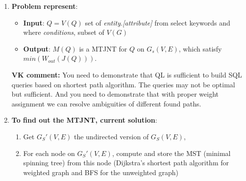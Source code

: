 \begin{enumerate}
\begin{itemize}
{\bf VK comment:} seems like no one use it

  \item JNT is a connected tree of tuples where every two adjacent tuples $t_i \in r(R_i)$ and $t_j \in r(R_j)$ can be joined based on the foreign key reference defined on relational schema $R_i$ and $R_j$ in $G_s(V,E)$ (either $R_i \rightarrow R_j$ or $R_j \rightarrow R_i$)
  \item MTJNT is the minimal total joining network of tuples.
    \begin{itemize}
    \item Minimal: a joining network of tuples in not total if any tuple is removed.

{\bf VK comment:} I don't get what do you mean by {\it in not total if any tuple is removed}?

    \item Total: each keyword in the query must be contained in at least one tuple of the joining network.
    \end{itemize}
  \item $w_{ij}[X]$, weight of edges ($Ri \rightarrow Rj$), we assign weight on each edge to represent the cost of {\it JOIN} on {\it attribute} $X$ between two nodes of this edges
  \item $W_{out}: \sum{w_{ij}}$ which $w_{ij}$ are edges of connect tree 
  \end{itemize}
\item {\bf Problem represent}:
\begin{itemize}
  \item {\bf Input}: $Q = V(Q)$  set of {\it entity.[attribute]} from select keywords and where {\it conditions}, subset of $V(G)$ 
  \item {\bf Output}: $M(Q)$ is a MTJNT for $Q$ on $G_s(V,E)$, which satisfy \\
        $min(W_{out}(J(Q)))$.
\end{itemize}

{\bf VK comment:} You need to demonstrate that QL is sufficient to build SQL queries
based on shortest path algorithm. The queries may not be optimal but sufficient.
And you need to demonstrate that with proper weight assignment we can resolve
ambiguities of different found paths.


\item {\bf To find out the MTJNT, current solution}:
  \begin{enumerate}
  \item Get $G_S'(V,E)$ the undirected version of $G_S(V, E)$,
  \item For each node on $G_S'(V,E)$, compute and store the MST (minimal spinning tree) from this node (Dijkstra's shortest path algorithm for weighted graph and BFS for the unweighted graph)



\end{enumerate}
\end{enumerate}
